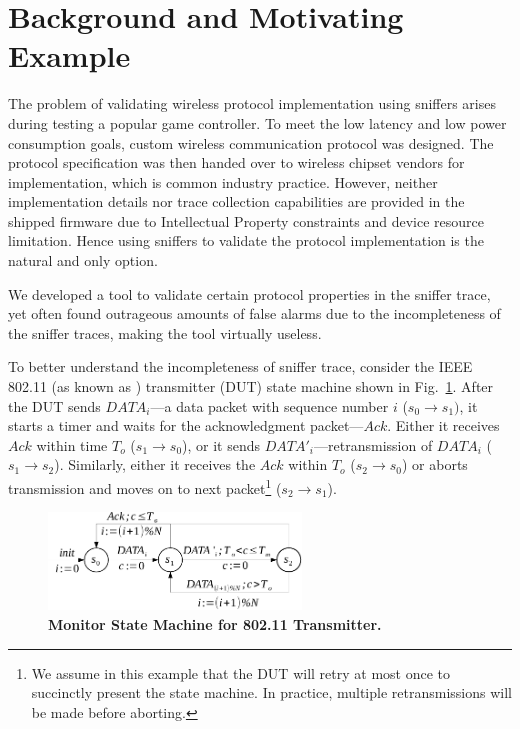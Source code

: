 \section{Background and Motivating Example}
\label{sec:motivation}

The problem of validating wireless protocol implementation using sniffers arises
during testing a popular game controller. To meet the low latency and low power
consumption goals, custom wireless communication protocol was designed. The
protocol specification was then handed over to wireless chipset vendors for
implementation, which is common industry practice. However, neither
implementation details nor trace collection capabilities are provided in the
shipped firmware due to Intellectual Property constraints and device resource
limitation. Hence using sniffers to validate the protocol implementation is the
natural and only option.

We developed a tool to validate certain protocol properties in the sniffer
trace, yet often found outrageous amounts of false alarms due to the
incompleteness of the sniffer traces, making the tool virtually useless.

To better understand the incompleteness of sniffer trace, consider the IEEE
802.11 (as known as \wifi{}) transmitter (DUT) state machine shown in
Fig.~\ref{fig:dot11_tx_ta}. After the DUT sends $DATA_i$---a data packet with
sequence number $i$ ($s_0\rightarrow s_1)$, it starts a timer and waits for the
acknowledgment packet---$Ack$. Either it receives $Ack$ within time $T_o$
($s_1\rightarrow s_0$), or it sends $DATA'_i$---retransmission of $DATA_i$
($s_1\rightarrow s_2$). Similarly, either it receives the $Ack$ within $T_o$
($s_2\rightarrow s_0$) or aborts transmission and moves on to next
packet\footnote{We assume in this example that the DUT will retry at most once
to succinctly present the state machine. In practice, multiple
retransmissions will be made before aborting.} ($s_2\rightarrow s_1$).

\begin{figure}[H]
  \centering
  \includegraphics[width=0.6\textwidth]{./figures/dot11_tx_ta.pdf}
  \caption{\textbf{Monitor State Machine for 802.11 Transmitter.}}
  \label{fig:dot11_tx_ta}
\end{figure}

